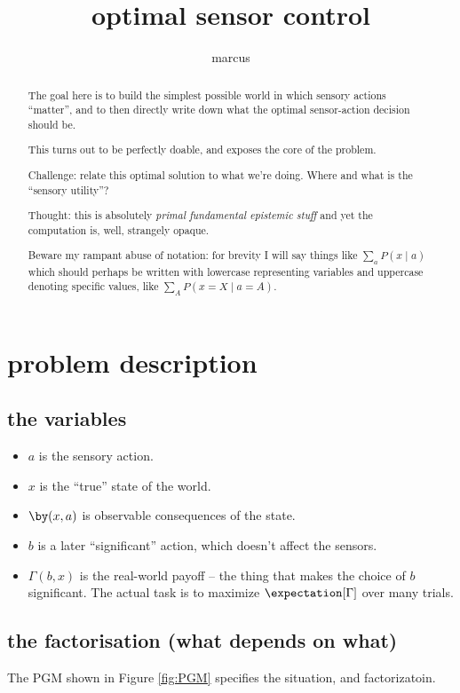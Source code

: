 \documentclass[11pt]{article}
\title{optimal sensor control}
\author{marcus}
\begin{document}
\maketitle

\begin{abstract}
The goal here is to build the simplest possible world in which sensory
actions ``matter'', and to then directly write down what the optimal
sensor-action decision should be. 

This turns out to be perfectly doable, and exposes the core of the problem.

Challenge: relate this optimal solution to what we're doing. Where and what is
the ``sensory utility''?


Thought: this is absolutely {\it primal fundamental epistemic stuff}
and yet the computation is, well, strangely opaque.

Beware my rampant abuse of notation: for brevity I will say things
like $\sum_a P(x \mid a)$ which should perhaps be written with
lowercase representing variables and uppercase denoting specific
values, like $\sum_A P(x=X \mid a=A)$. 

\end{abstract}

\tableofcontents

\newpage
\section{problem description}


\subsection{the variables}
\begin{itemize}
\item $a$ is the sensory action.
\item $x$ is the ``true'' state of the world.
\item $\by(x,a)$ is observable consequences of the state. 
\item $b$ is a later ``significant'' action, which doesn't affect the sensors.
\item $\Gamma(b,x)$ is the real-world payoff -- the thing that makes
  the choice of $b$ significant. The actual task is to maximize
  $\expectation[\Gamma]$ over many trials. 
\end{itemize}


\subsection{the factorisation (what depends on what)}
The PGM shown in Figure \ref{fig:PGM} specifies the situation, and factorizatoin.
\end{document}
